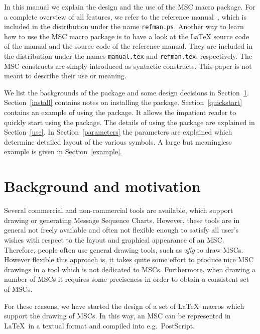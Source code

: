 \documentclass[12pt,a4paper]{article}
\newcommand{\acro}[1]{{#1}}
\newcommand{\MSC}{\acro{MSC}}
\newcommand{\mscpack}{\MSC{} macro package}
\begin{document}
In this manual we explain the design and the use of the \mscpack. For
a complete overview of all features, we refer to the reference
manual~\cite{BM02}, which is included in the distribution under the
name \verb+refman.ps+. Another way to learn how to use the \mscpack{}
is to have a look at the \LaTeX{} source code of the manual and the
source code of the reference manual. They are included in the
distribution under the names \verb+manual.tex+ and \verb+refman.tex+,
respectively.  The \MSC{} constructs are simply introduced as
syntactic constructs. This paper is not meant to describe their use or
meaning.

We list the backgrounds of the package and some design decisions in
Section~\ref{background}.
Section~\ref{install} contains notes on installing the
package. Section~\ref{quickstart} contains an example of using the
package. It allows the impatient reader to quickly start using the
package. The details of using the package are explained in
Section~\ref{use}. In Section~\ref{parameters} the parameters are
explained which determine detailed layout of the various symbols.
A large but meaningless example is given in
Section~\ref{example}.


\section{Background and motivation}
\label{background}
Several commercial and non-commercial tools are available, which
support drawing or generating Message Sequence Charts. However, these
tools are in general not freely available and often not flexible
enough to satisfy all user's wishes with respect to the layout and
graphical appearance of an \MSC{}.
Therefore, people often use general drawing tools, such as {\em xfig}
to draw \MSC{}s. However flexible this approach is, it takes quite some
effort to produce nice \MSC{} drawings in a tool which is not dedicated
to \MSC{}s. Furthermore, when drawing a number of \MSC{}s it requires some
preciseness in order to obtain a consistent set of \MSC{}s.

For these reasons, we have started the design of a set of
\LaTeX\ macros which support the drawing of \MSC{}s. In this way, an \MSC{} can be
represented in \LaTeX\ in a textual format and compiled into
e.g.\ PostScript.
\end{document}
